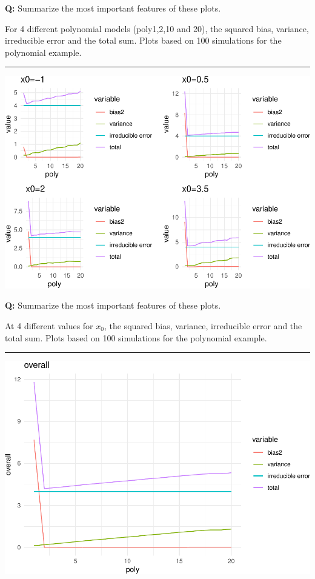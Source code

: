 \documentclass[]{article}
\begin{document}
\textbf{Q:} Summarize the most important features of these plots.

For 4 different polynomial models (poly1,2,10 and 20), the squared bias,
variance, irreducible error and the total sum. Plots based on 100
simulations for the polynomial example.

\begin{center}\rule{0.5\linewidth}{\linethickness}\end{center}

\includegraphics{2StatLearn_files/figure-latex/biasvarianceforpoly-1.pdf}

\textbf{Q:} Summarize the most important features of these plots.

At 4 different values for \(x_0\), the squared bias, variance,
irreducible error and the total sum. Plots based on 100 simulations for
the polynomial example.

\begin{center}\rule{0.5\linewidth}{\linethickness}\end{center}

\includegraphics{2StatLearn_files/figure-latex/averageoverxs-1.pdf}
\end{document}
